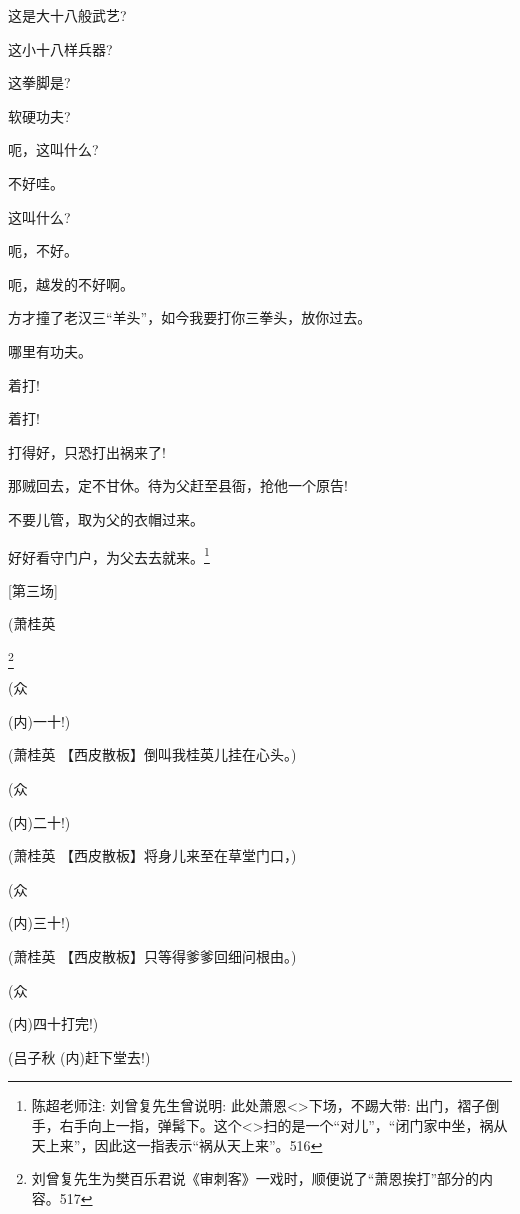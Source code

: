 {这是大十八般武艺?}

{这小十八样兵器?}

{这拳脚是?}

{软硬功夫?}

{呃，这叫什么?}

{不好哇。}

{这叫什么?}

{呃，不好。}

{呃，越发的不好啊。}

{方才撞了老汉三``羊头''，如今我要打你三拳头，放你过去。}

{哪里有功夫。}

{着打!}

{着打!}

{打得好，只恐打出祸来了!}

{那贼回去，定不甘休。待为父赶至县衙，抢他一个原告!}

{不要儿管，取为父的衣帽过来。}

{好好看守门户，为父去去就来。}\footnote{ 陈超老师注: 刘曾复先生曾说明: 此处萧恩\textless{}\!\textgreater{}下场，不踢大带: 出门，褶子倒手，右手向上一指，弹髯下。这个\textless{}\!\textgreater{}扫的是一个``对儿''，``闭门家中坐，祸从天上来''，因此这一指表示``祸从天上来''。{516}}

{[}第三场{]}

{(萧桂英

\footnote{ 刘曾复先生为樊百乐君说《审刺客》一戏时，顺便说了``萧恩挨打''部分的内容。{517}} }

{(众\hspace{40pt}~

({\akai 内})一十!)}

{(萧桂英 【{\akai 西皮散板}】倒叫我桂英儿挂在心头。)}

{(众\hspace{40pt}~

({\akai 内})二十!)}

{(萧桂英 【{\akai 西皮散板}】将身儿来至在草堂门口，)}

{(众\hspace{40pt}~

({\akai 内})三十!)}

{(萧桂英 【{\akai 西皮散板}】只等得爹爹回细问根由。)}

{(众\hspace{40pt}~

({\akai 内})四十打完!)}

{(吕子秋 ({\akai 内})赶下堂去!)}

